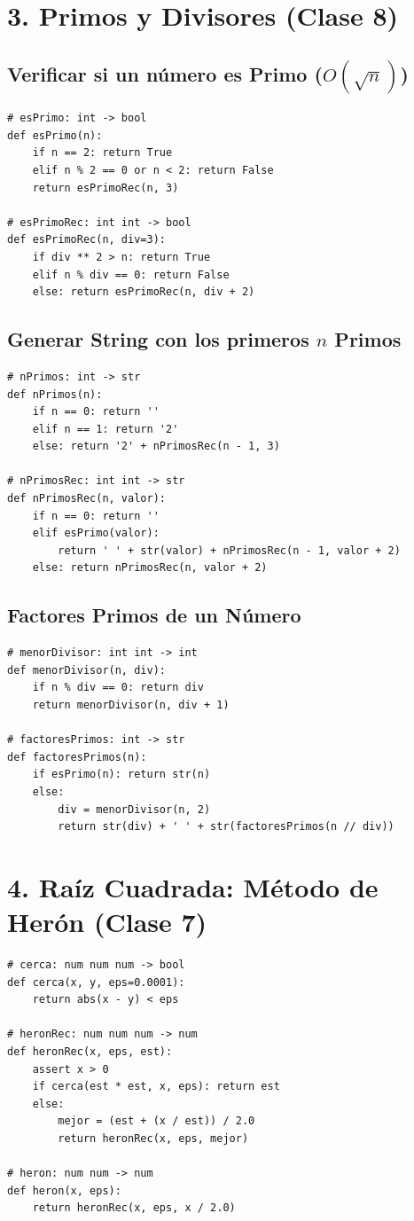 \documentclass[8pt,twocolumn]{article}
\begin{document}
\section{3. Primos y Divisores (Clase 8)}
\subsection{Verificar si un número es Primo ($O(\sqrt{n})$)}
\begin{verbatim}
# esPrimo: int -> bool
def esPrimo(n):
    if n == 2: return True
    elif n % 2 == 0 or n < 2: return False
    return esPrimoRec(n, 3)

# esPrimoRec: int int -> bool
def esPrimoRec(n, div=3):
    if div ** 2 > n: return True
    elif n % div == 0: return False
    else: return esPrimoRec(n, div + 2)
\end{verbatim}

\subsection{Generar String con los primeros $n$ Primos}
\begin{verbatim}
# nPrimos: int -> str
def nPrimos(n):
    if n == 0: return ''
    elif n == 1: return '2'
    else: return '2' + nPrimosRec(n - 1, 3)

# nPrimosRec: int int -> str
def nPrimosRec(n, valor):
    if n == 0: return ''
    elif esPrimo(valor):
        return ' ' + str(valor) + nPrimosRec(n - 1, valor + 2)
    else: return nPrimosRec(n, valor + 2)
\end{verbatim}

\subsection{Factores Primos de un Número}
\begin{verbatim}
# menorDivisor: int int -> int
def menorDivisor(n, div):
    if n % div == 0: return div
    return menorDivisor(n, div + 1)

# factoresPrimos: int -> str
def factoresPrimos(n):
    if esPrimo(n): return str(n)
    else:
        div = menorDivisor(n, 2)
        return str(div) + ' ' + str(factoresPrimos(n // div))
\end{verbatim}

\section{4. Raíz Cuadrada: Método de Herón (Clase 7)}
\begin{verbatim}
# cerca: num num num -> bool
def cerca(x, y, eps=0.0001):
    return abs(x - y) < eps

# heronRec: num num num -> num
def heronRec(x, eps, est):
    assert x > 0
    if cerca(est * est, x, eps): return est
    else:
        mejor = (est + (x / est)) / 2.0
        return heronRec(x, eps, mejor)

# heron: num num -> num
def heron(x, eps):
    return heronRec(x, eps, x / 2.0)
\end{verbatim}
\end{document}

